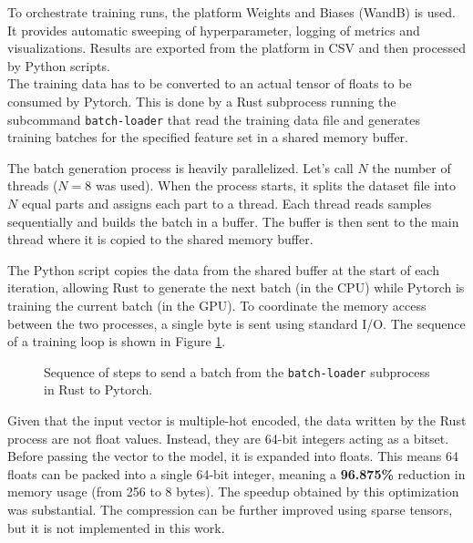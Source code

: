 To orchestrate training runs, the platform Weights and Biases (WandB) is used. It provides automatic sweeping of hyperparameter, logging of metrics and visualizations. Results are exported from the platform in CSV and then processed by Python scripts. \\

The training data has to be converted to an actual tensor of floats to be consumed by Pytorch. This is done by a Rust subprocess running the subcommand \texttt{batch-loader} that read the training data file and generates training batches for the specified feature set in a shared memory buffer.

The batch generation process is heavily parallelized. Let's call $N$ the number of threads ($N=8$ was used). When the process starts, it splits the dataset file into $N$ equal parts and assigns each part to a thread. Each thread reads samples sequentially and builds the batch in a buffer. The buffer is then sent to the main thread where it is copied to the shared memory buffer.

The Python script copies the data from the shared buffer at the start of each iteration, allowing Rust to generate the next batch (in the CPU) while Pytorch is training the current batch (in the GPU). To coordinate the memory access between the two processes, a single byte is sent using standard I/O. The sequence of a training loop is shown in Figure \ref{training-loop}.

\begin{figure}[H]
\centering
{}
\caption{Sequence of steps to send a batch from the \texttt{batch-loader} subprocess in Rust to Pytorch.}
\label{training-loop}
\end{figure}

Given that the input vector is multiple-hot encoded, the data written by the Rust process are not float values. Instead, they are 64-bit integers acting as a bitset. Before passing the vector to the model, it is expanded into floats. This means 64 floats can be packed into a single 64-bit integer, meaning a \textbf{96.875\%} reduction in memory usage (from 256 to 8 bytes). The speedup obtained by this optimization was substantial. The compression can be further improved using sparse tensors, but it is not implemented in this work. \\



